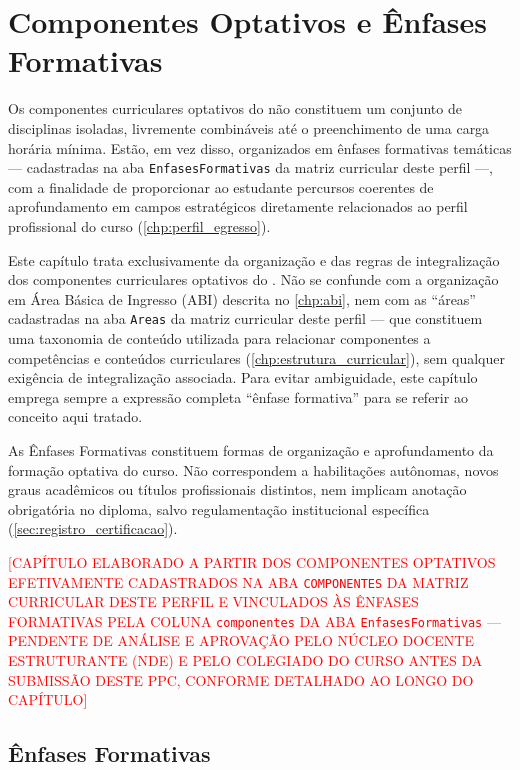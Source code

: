\chapter{Componentes Optativos e Ênfases Formativas}
\label{chp:modulos_optativos}

Os componentes curriculares optativos do \ppccurso não constituem um conjunto de disciplinas isoladas, livremente combináveis até o preenchimento de uma carga horária mínima. Estão, em vez disso, organizados em ênfases formativas temáticas — cadastradas na aba \texttt{EnfasesFormativas} da matriz curricular deste perfil —, com a finalidade de proporcionar ao estudante percursos coerentes de aprofundamento em campos estratégicos diretamente relacionados ao perfil profissional do curso (\autoref{chp:perfil_egresso}).

Este capítulo trata exclusivamente da organização e das regras de integralização dos componentes curriculares optativos do \ppccurso. Não se confunde com a organização em Área Básica de Ingresso (ABI) descrita no \autoref{chp:abi}, nem com as ``áreas'' cadastradas na aba \texttt{Areas} da matriz curricular deste perfil — que constituem uma taxonomia de conteúdo utilizada para relacionar componentes a competências e conteúdos curriculares (\autoref{chp:estrutura_curricular}), sem qualquer exigência de integralização associada. Para evitar ambiguidade, este capítulo emprega sempre a expressão completa ``ênfase formativa'' para se referir ao conceito aqui tratado.

As Ênfases Formativas constituem formas de organização e aprofundamento da formação optativa do curso. Não correspondem a habilitações autônomas, novos graus acadêmicos ou títulos profissionais distintos, nem implicam anotação obrigatória no diploma, salvo regulamentação institucional específica (\autoref{sec:registro_certificacao}).

\textcolor{red}{[CAPÍTULO ELABORADO A PARTIR DOS COMPONENTES OPTATIVOS EFETIVAMENTE CADASTRADOS NA ABA \texttt{COMPONENTES} DA MATRIZ CURRICULAR DESTE PERFIL E VINCULADOS ÀS ÊNFASES FORMATIVAS PELA COLUNA \texttt{componentes} DA ABA \texttt{EnfasesFormativas} — PENDENTE DE ANÁLISE E APROVAÇÃO PELO NÚCLEO DOCENTE ESTRUTURANTE (NDE) E PELO COLEGIADO DO CURSO ANTES DA SUBMISSÃO DESTE PPC, CONFORME DETALHADO AO LONGO DO CAPÍTULO]}

\section{Ênfases Formativas}
\label{sec:modulos_areas_conceito}

